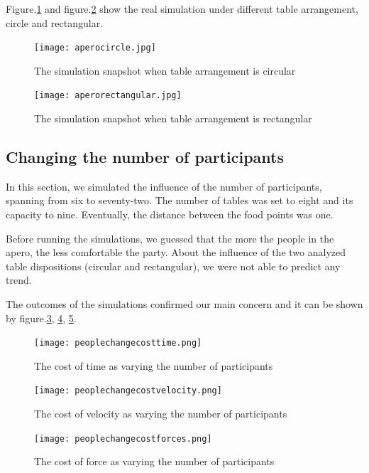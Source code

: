 \documentclass[11pt]{article}
\begin{document}
Figure.\ref{fig:aperocircle} and figure.\ref{fig:aperorectangular} show the real simulation under different table arrangement, circle and rectangular.
\begin{figure}[H]
    \centering
    \texttt{[image: aperocircle.jpg]}
    \caption{The simulation snapshot when table arrangement is circular}
    \label{fig:aperocircle}
\end{figure}

\begin{figure}[H]
    \centering
    \texttt{[image: aperorectangular.jpg]}
    \caption{The simulation snapshot when table arrangement is rectangular}
    \label{fig:aperorectangular}
\end{figure}



\subsection{Changing the number of participants}
In this section, we simulated the influence of the number of participants, spanning from six to seventy-two. The number of tables was set to eight and its capacity to nine. Eventually, the distance between the food points was one.

Before running the simulations, we guessed that the more the people in the apero, the less comfortable the party. About the influence of the two analyzed table dispositions (circular and rectangular), we were not able to predict any trend.

The outcomes of the simulations confirmed our main concern and it can be shown by figure.\ref{fig:peoplecostt}, \ref{fig:peoplecostv}, \ref{fig:peoplecostf}.

\begin{figure}[H]
\centering
\texttt{[image: peoplechangecosttime.png]}
\caption{The cost of time as varying the number of participants}
\label{fig:peoplecostt}
\end{figure}

\begin{figure}[H]
\centering
\texttt{[image: peoplechangecostvelocity.png]}
\caption{The cost of velocity as varying the number of participants}
\label{fig:peoplecostv}
\end{figure}

\begin{figure}[H]
\centering
\texttt{[image: peoplechangecostforces.png]}
\caption{The cost of force as varying the number of participants}
\label{fig:peoplecostf}
\end{figure}
\end{document}
